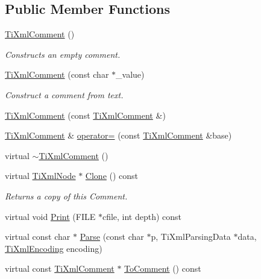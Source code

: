 \subsection*{Public Member Functions}
\begin{DoxyCompactItemize}
\item 
\hyperlink{class_ti_xml_comment_aaa3252031d3e8bd3a2bf51a1c61201b7}{Ti\+Xml\+Comment} ()
\begin{DoxyCompactList}\small\item\em Constructs an empty comment. \end{DoxyCompactList}\item 
\hyperlink{class_ti_xml_comment_a37e7802ef17bc03ebe5ae79bf0713d47}{Ti\+Xml\+Comment} (const char $\ast$\+\_\+value)
\begin{DoxyCompactList}\small\item\em Construct a comment from text. \end{DoxyCompactList}\item 
\hyperlink{class_ti_xml_comment_afaec41ac2760ce946ba1590eb5708e50}{Ti\+Xml\+Comment} (const \hyperlink{class_ti_xml_comment}{Ti\+Xml\+Comment} \&)
\item 
\hyperlink{class_ti_xml_comment}{Ti\+Xml\+Comment} \& \hyperlink{class_ti_xml_comment_aeceedc15f8b8f9ca0b6136696339b3ac}{operator=} (const \hyperlink{class_ti_xml_comment}{Ti\+Xml\+Comment} \&base)
\item 
virtual \hyperlink{class_ti_xml_comment_a3264ae2e9c4a127edfa03289bb2c9aa2}{$\sim$\+Ti\+Xml\+Comment} ()
\item 
virtual \hyperlink{class_ti_xml_node}{Ti\+Xml\+Node} $\ast$ \hyperlink{class_ti_xml_comment_a4f6590c9c9a2b63a48972655b78eb853}{Clone} () const 
\begin{DoxyCompactList}\small\item\em Returns a copy of this Comment. \end{DoxyCompactList}\item 
virtual void \hyperlink{class_ti_xml_comment_a17398061d62c470f57801ce28fa33ad4}{Print} (F\+I\+LE $\ast$cfile, int depth) const 
\item 
virtual const char $\ast$ \hyperlink{class_ti_xml_comment_a11f1ee9d37a49c06f297c827d0f4e790}{Parse} (const char $\ast$p, Ti\+Xml\+Parsing\+Data $\ast$data, \hyperlink{tinyxml_8h_a88d51847a13ee0f4b4d320d03d2c4d96}{Ti\+Xml\+Encoding} encoding)
\item 
virtual const \hyperlink{class_ti_xml_comment}{Ti\+Xml\+Comment} $\ast$ \hyperlink{class_ti_xml_comment_a00fb4215c20a2399ea05ac9b9e7e68a0}{To\+Comment} () const 

\end{DoxyCompactItemize}
